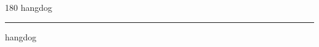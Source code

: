 
\begin{frame}
\begin{center}
\begin{turn}{180}
{\fontsize{2.5cm}{1em}\selectfont hangdog}
\end{turn}
\vspace{1em}\par  
\hrule
\vspace{1em}\par  
{\fontsize{2.5cm}{1em}\selectfont hangdog}
\end{center}
\end{frame}
